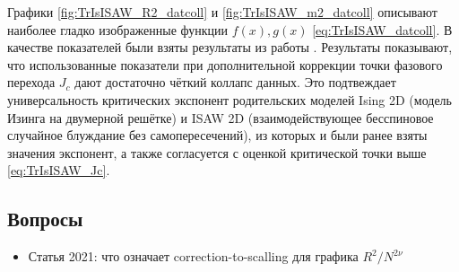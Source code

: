 Графики \ref{fig:TrIsISAW_R2_datcoll} и \ref{fig:TrIsISAW_m2_datcoll} описывают наиболее гладко изображенные функции $f(x), g(x)$ \eqref{eq:TrIsISAW_datcoll}.
В качестве показателей были взяты результаты из работы \cite{faizullina2021critical}.
Результаты показывают, что использованные показатели при дополнительной коррекции точки фазового перехода $J_c$ дают достаточно чёткий коллапс данных.
Это подтвеждает универсальность критических экспонент родительских моделей Ising 2D (модель Изинга на двумерной решётке) 
и ISAW 2D (взаимодействующее бесспиновое случайное блуждание без самопересечений), из которых и были ранее взяты значения экспонент,
а также согласуется с оценкой критической точки выше \eqref{eq:TrIsISAW_Jc}.


\subsection{Вопросы}

\begin{itemize}
\item Статья 2021: что означает correction-to-scalling для графика $R^2 / N^{2\nu}$
\end{itemize}


